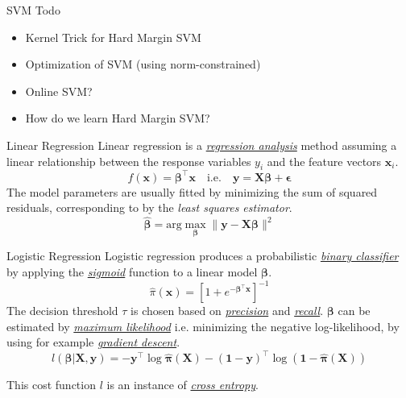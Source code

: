 \documentclass{cognito}
\begin{document}
\begin{draft}{SVM Todo}
	\begin{itemize}
		\item Kernel Trick for Hard Margin SVM
		\item Optimization of SVM (using norm-constrained)
		\item Online SVM?
		\item How do we learn Hard Margin SVM?
	\end{itemize}
\end{draft}

\begin{note}{Linear Regression}
	Linear regression is a  \hyperref[note:Supervised Learning]{\it regression analysis} method
	assuming a linear relationship between the response variables $y_i$ and the feature vectors $\bm x_i$.
	$$ f(\bm x) = \bm\beta^\intercal \bm x \quad \text{i.e.} \quad \bm y = \bm X \bm\beta + \bm \epsilon $$
	The model parameters are usually fitted by minimizing the sum of squared residuals, corresponding to by the {\it least squares estimator}.
	$$ \hat {\bm \beta} = \text{arg}\max_{\bm\beta} \| \bm y - \bm X \bm\beta \|^2 $$
	\vspace{-10pt}
\end{note}

\begin{note}{Logistic Regression}
	Logistic regression produces a probabilistic \hyperref[note:Supervised Learning]{\it binary classifier}
	by applying the \hyperref[note:Sigmoid Function]{\it sigmoid} function to a linear model $\bm \beta$.
	$$
		\hat \pi(\bm x) = \left[1 + e^{- \bm \beta^\intercal \bm x} \right]^{-1}
	$$
	The decision threshold $\tau$ is chosen based on \hyperref[note:Precision]{\it precision} and \hyperref[note:Recall]{\it recall}.
	$\bm \beta$ can be estimated by \hyperref[note:Maximum Likelihood Estimator]{\it maximum likelihood}
	i.e. minimizing the negative log-likelihood, by using for example \hyperref[note:Gradient Descent]{\it gradient descent}.
	$$
		l(\bm \beta \vert \bm X, \bm y) = - \bm y^\intercal \log \hat {\bm \pi}(\bm X) - (\bm 1 - \bm y)^\intercal \log \left(\bm 1 - \hat {\bm \pi}(\bm X) \right)
	$$
	\begin{remark} This cost function $l$ is an instance of \hyperref[note:Cross Entropy]{\it cross entropy}. \end{remark}
	\vspace{-5pt}
\end{note}
\end{document}

